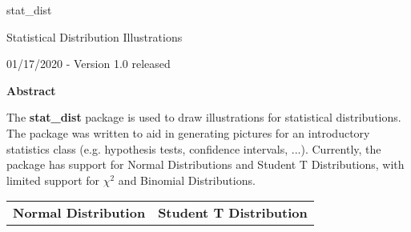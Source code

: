 \documentclass[11pt,letterpaper]{article}
\begin{document}
\centerline{stat\_dist}

\centerline{Statistical Distribution Illustrations}

\centerline{01/17/2020 - Version 1.0 released}

\vspace*{10pt}

\centerline{\textbf{Abstract}}

The \textbf{stat\_dist} package is used to draw illustrations for
statistical distributions.  The package was written to aid in
generating pictures for an introductory statistics class
(e.g. hypothesis tests, confidence intervals, ...).  Currently, the
package has support for Normal Distributions and Student T
Distributions, with limited support for $\chi^2$ and Binomial
Distributions.

\begin{tabu} to 0.8\linewidth{|c|c|} \tabucline{-}
  \textbf{Normal Distribution} & \textbf{Student T Distribution} \\[10pt]


\end{tabu}
\end{document}
